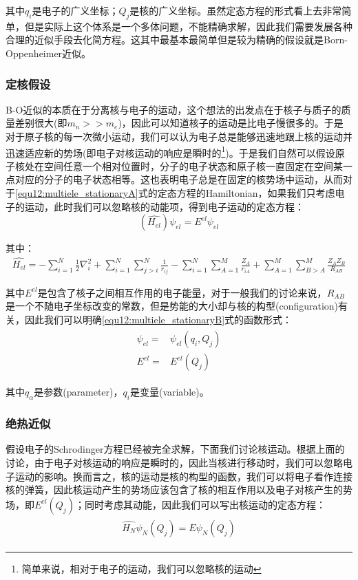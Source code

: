         其中$q_i$是电子的广义坐标；$Q_j$是核的广义坐标。虽然定态方程的形式看上去非常简单，但是实际上这个体系是一个多体问题，不能精确求解，因此我们需要发展各种合理的近似手段去化简方程。这其中最基本最简单但是较为精确的假设就是Born-Oppenheimer近似。
        \subsubsection{定核假设}
        B-O近似的本质在于分离核与电子的运动，这个想法的出发点在于核子与质子的质量差别很大(即$m_n>>m_e$)，因此可以知道核子的运动是比电子慢很多的。于是对于原子核的每一次微小运动，我们可以认为电子总是能够迅速地跟上核的运动并迅速适应新的势场(即电子对核运动的响应是瞬时的\footnote{简单来说，相对于电子的运动，我们可以忽略核的运动})。于是我们自然可以假设原子核处在空间任意一个相对位置时，分子的电子状态和原子核一直固定在空间某一点对应的分子的电子状态相等。这也表明电子总是在固定的核势场中运动，从而对于\ref{equ12:multiele_stationaryA}式的定态方程的Hamiltonian，如果我们只考虑电子的运动，此时我们可以忽略核的动能项，得到电子运动的定态方程：
        \begin{equation}
            (\hat{H_{el}})\psi_{el}=E^{el}\psi_{el}
        \end{equation}
        
        其中：
        \begin{align}\label{equ12:multiele_stationaryB}
                \hat{H_{el}}=-\sum_{i=1}^N\frac{1}{2}\nabla_i^2+\sum_{i=1}^{N}\sum_{j>i}^N\frac{1}{r_{ij}}-\sum_{i=1}^N\sum_{A=1}^M\frac{Z_A}{r_{iA}}+\sum_{A=1}^{M}\sum_{B>A}^M\frac{Z_AZ_B}{R_{AB}}
        \end{align}
        
        其中$E^{el}$是包含了核子之间相互作用的电子能量，对于一般我们的讨论来说，$R_{AB}$是一个不随电子坐标改变的常数，但是势能的大小却与核的构型(configuration)有关，因此我们可以明确\ref{equ12:multiele_stationaryB}式的函数形式：
        \begin{align}
            \begin{split}
                \psi_{el}=&\psi_{el}(q_i,Q_j)\\
                E^{el}=&E^{el}(Q_j)
            \end{split}
        \end{align}
        
        其中$q_\alpha$是参数(parameter)，$q_i$是变量(variable)。
        \subsubsection{绝热近似}
        假设电子的Schrodinger方程已经被完全求解，下面我们讨论核运动。根据上面的讨论，由于电子对核运动的响应是瞬时的，因此当核进行移动时，我们可以忽略电子运动的影响。换而言之，核的运动是核的构型的函数，我们可以将电子看作连接核的弹簧，因此核运动产生的势场应该包含了核的相互作用以及电子对核产生的势场，即$E^{el}(Q_j)$；同时考虑其动能，因此我们可以写出核运动的定态方程：
        \begin{align}
            \begin{split}
                \hat{H_N}\psi_N(Q_j)=E\psi_N(Q_j)
            \end{split}
        \end{align}
        
